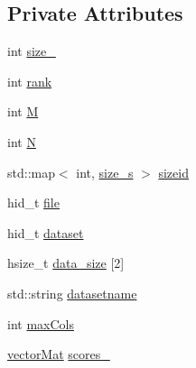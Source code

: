 \subsection*{Private Attributes}
\begin{DoxyCompactItemize}
\item 
int \hyperlink{classHDF_a4b0ee3e98c89b373052525bb5abd8fae}{size\-\_\-}
\item 
int \hyperlink{classHDF_ad8673b6d5dacddd59fcb8c10682160f7}{rank}
\item 
int \hyperlink{classHDF_aee1593ceda7b33a941e52e9f6e998f51}{M}
\item 
int \hyperlink{classHDF_ab3b5c9aa5d584ac3aa16ee9c6d04c340}{N}
\item 
std\-::map$<$ int, \hyperlink{structHDF_1_1size__s}{size\-\_\-s} $>$ \hyperlink{classHDF_ab47d2b1f7a374429d26ec54f15f4cea5}{sizeid}
\item 
hid\-\_\-t \hyperlink{classHDF_ab7e91e3f89c7fb189e0b0d9705d2f569}{file}
\item 
hid\-\_\-t \hyperlink{classHDF_adc37f93332228a0d29d1d0b8f7021b0c}{dataset}
\item 
hsize\-\_\-t \hyperlink{classHDF_a5fcc08146bef981eb0c865e01f8578a3}{data\-\_\-size} \mbox{[}2\mbox{]}
\item 
std\-::string \hyperlink{classHDF_a9b95020b5a2be0e7d2930c1221df9aa4}{datasetname}
\item 
int \hyperlink{classHDF_a5cd5534b56df9e71611cbc463f2e8604}{max\-Cols}
\item 
\hyperlink{types_8hpp_a3207a7addcfa415d1c83622febcb1e9b}{vector\-Mat} \hyperlink{classHDF_a699a9f1244c7498da0559a4896b9db75}{scores\-\_\-}
\end{DoxyCompactItemize}


